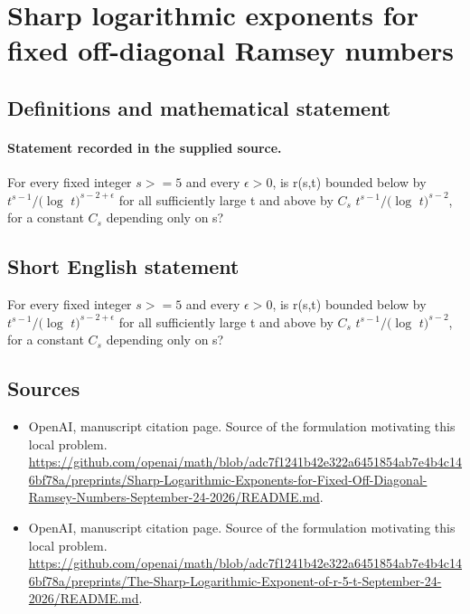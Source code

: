 \documentclass[11pt]{article}
\begin{document}
\section*{Sharp logarithmic exponents for fixed off-diagonal Ramsey numbers}\label{statement}
\subsection{Definitions and mathematical statement}
\paragraph{Statement recorded in the supplied source.}
For every fixed integer $s>=5$ and every $\epsilon >0$, is r(s,t) bounded below by $t^{s-1}/(\log $ $t)^{s-2+\epsilon }$ for all sufficiently large t and above by $C_s$ $t^{s-1}/(\log $ $t)^{s-2}$, for a constant $C_s$ depending only on s?
\subsection{Short English statement}
For every fixed integer $s>=5$ and every $\epsilon >0$, is r(s,t) bounded below by $t^{s-1}/(\log $ $t)^{s-2+\epsilon }$ for all sufficiently large t and above by $C_s$ $t^{s-1}/(\log $ $t)^{s-2}$, for a constant $C_s$ depending only on s?
\subsection{Sources}
\begin{itemize}
\item[S1] OpenAI, manuscript citation page. Source of the formulation motivating this local problem.
\url{https://github.com/openai/math/blob/adc7f1241b42e322a6451854ab7e4b4c146bf78a/preprints/Sharp-Logarithmic-Exponents-for-Fixed-Off-Diagonal-Ramsey-Numbers-September-24-2026/README.md}.
\item[S2] OpenAI, manuscript citation page. Source of the formulation motivating this local problem.
\url{https://github.com/openai/math/blob/adc7f1241b42e322a6451854ab7e4b4c146bf78a/preprints/The-Sharp-Logarithmic-Exponent-of-r-5-t-September-24-2026/README.md}.
\end{itemize}
\end{document}
